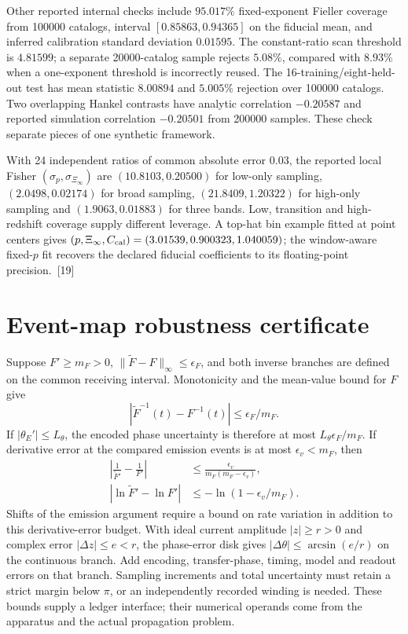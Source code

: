 \documentclass[10pt,twocolumn,letterpaper]{article}
\begin{document}
Other reported internal checks include $95.017\%$ fixed-exponent Fieller coverage from 100000 catalogs, interval $[0.85863,0.94365]$ on the fiducial mean, and inferred calibration standard deviation $0.01595$. The constant-ratio scan threshold is $4.81599$; a separate 20000-catalog sample rejects $5.08\%$, compared with $8.93\%$ when a one-exponent threshold is incorrectly reused. The 16-training/eight-held-out test has mean statistic $8.00894$ and $5.005\%$ rejection over 100000 catalogs. Two overlapping Hankel contrasts have analytic correlation $-0.20587$ and reported simulation correlation $-0.20501$ from 200000 samples. These check separate pieces of one synthetic framework.

With 24 independent ratios of common absolute error $0.03$, the reported local Fisher $(\sigma_p,\sigma_{\Xi_\infty})$ are $(10.8103,0.20500)$ for low-only sampling, $(2.0498,0.02174)$ for broad sampling, $(21.8409,1.20322)$ for high-only sampling and $(1.9063,0.01883)$ for three bands. Low, transition and high-redshift coverage supply different leverage. A top-hat bin example fitted at point centers gives $(p,\Xi_\infty,C_{\rm cal})=(3.01539,0.900323,1.040059)$; the window-aware fixed-$p$ fit recovers the declared fiducial coefficients to its floating-point precision.~[19]

\section{Event-map robustness certificate}\label{app:event-error}
Suppose $F'\ge m_F>0$, $\|\widetilde F-F\|_\infty\le\epsilon_F$, and both inverse branches are defined on the common receiving interval. Monotonicity and the mean-value bound for $F$ give
\[
 |\widetilde F^{-1}(t)-F^{-1}(t)|\le\epsilon_F/m_F.
\]
If $|\theta_E'|\le L_\theta$, the encoded phase uncertainty is therefore at most $L_\theta\epsilon_F/m_F$. If derivative error at the compared emission events is at most $\epsilon_v<m_F$, then
\[
\begin{aligned}
 \left|\frac 1{\widetilde F'}-\frac 1{F'}\right|
 &\le\frac{\epsilon_v}{m_F(m_F-\epsilon_v)},\\
 |\ln\widetilde F'-\ln F'|&\le-\ln(1-\epsilon_v/m_F).
\end{aligned}
\]
Shifts of the emission argument require a bound on rate variation in addition to this derivative-error budget. With ideal current amplitude $|z|\ge r>0$ and complex error $|\Delta z|\le e<r$, the phase-error disk gives $|\Delta\theta|\le\arcsin(e/r)$ on the continuous branch. Add encoding, transfer-phase, timing, model and readout errors on that branch. Sampling increments and total uncertainty must retain a strict margin below $\pi$, or an independently recorded winding is needed. These bounds supply a ledger interface; their numerical operands come from the apparatus and the actual propagation problem.
\end{document}
